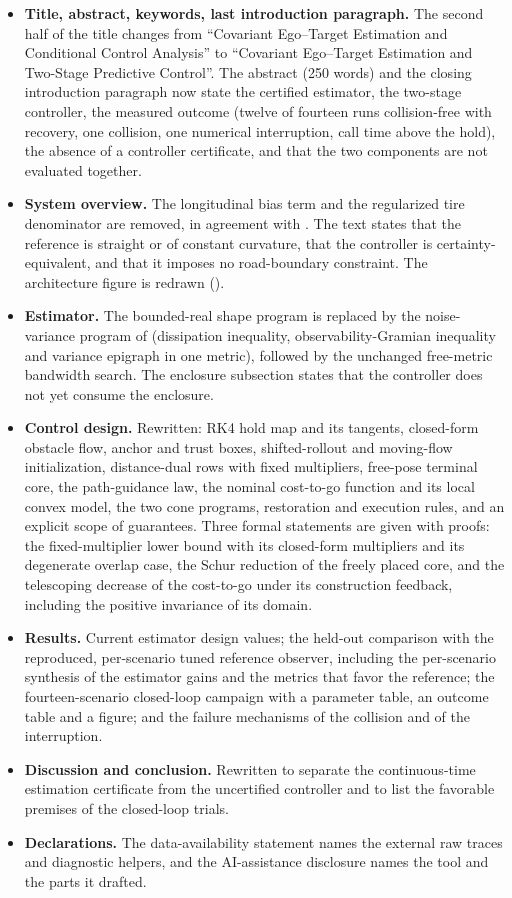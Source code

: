 \documentclass[11pt]{article}
\begin{document}
\begin{itemize}
\item \textbf{Title, abstract, keywords, last introduction paragraph.} The
second half of the title changes from ``Covariant Ego--Target Estimation and
Conditional Control Analysis'' to ``Covariant Ego--Target Estimation and
Two-Stage Predictive Control''. The abstract (250 words) and the closing
introduction paragraph now state the certified estimator, the two-stage
controller, the measured outcome (twelve of fourteen runs collision-free
with recovery, one collision, one numerical interruption, call time above
the hold), the absence of a controller certificate, and that the two
components are not evaluated together.
\item \textbf{System overview.} The longitudinal bias term and the
regularized tire denominator are removed, in agreement with
. The text states that the reference
is straight or of constant curvature, that the controller is
certainty-equivalent, and that it imposes no road-boundary constraint. The
architecture figure is redrawn ().
\item \textbf{Estimator.} The bounded-real shape program is replaced by the
noise-variance program of 
(dissipation inequality, observability-Gramian inequality and variance
epigraph in one metric), followed by the unchanged free-metric bandwidth
search. The enclosure subsection states that the controller does not yet
consume the enclosure.
\item \textbf{Control design.} Rewritten: RK4 hold map and its tangents,
closed-form obstacle flow, anchor and trust boxes, shifted-rollout and
moving-flow initialization, distance-dual rows with fixed multipliers,
free-pose terminal core, the path-guidance law, the nominal cost-to-go
function and its local convex model, the two cone programs, restoration and
execution rules, and an explicit scope of guarantees. Three formal
statements are given with proofs: the fixed-multiplier lower bound with its
closed-form multipliers and its degenerate overlap case, the Schur
reduction of the freely placed core, and the telescoping decrease of the
cost-to-go under its construction feedback, including the positive
invariance of its domain.
\item \textbf{Results.} Current estimator design values; the held-out
comparison with the reproduced, per-scenario tuned reference observer,
including the per-scenario synthesis of the estimator gains and the metrics
that favor the reference; the fourteen-scenario closed-loop campaign with a
parameter table, an outcome table and a figure; and the failure mechanisms
of the collision and of the interruption.
\item \textbf{Discussion and conclusion.} Rewritten to separate the
continuous-time estimation certificate from the uncertified controller and
to list the favorable premises of the closed-loop trials.
\item \textbf{Declarations.} The data-availability statement names the
external raw traces and diagnostic helpers, and the AI-assistance
disclosure names the tool and the parts it drafted.
\end{itemize}
\end{document}
